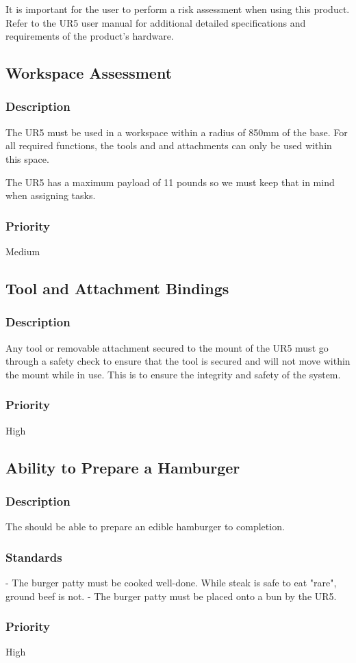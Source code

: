 It is important for the user to perform a risk assessment when using this product. Refer to the UR5 user manual for additional detailed specifications and requirements of the product's hardware. 

\subsection{Workspace Assessment}
\subsubsection{Description}
The UR5 must be used in a workspace within a radius of 850mm of the base. For all required functions, the tools and and attachments can only be used within this space. 

The UR5 has a maximum payload of 11 pounds so we must keep that in mind when assigning tasks.
\subsubsection{Priority}
Medium

\subsection{Tool and Attachment Bindings}
\subsubsection{Description}
Any tool or removable attachment secured to the mount of the UR5 must go through a safety check to ensure that the tool is secured and will not move within the mount while in use. This is to ensure the integrity and safety of the system.
\subsubsection{Priority}
High


\subsection{Ability to Prepare a Hamburger}
\subsubsection{Description}
The \productname{} should be able to prepare an edible hamburger to completion. 
\subsubsection{Standards}
- The burger patty must be cooked well-done. While steak is safe to eat "rare", ground beef is not. 
- The burger patty must be placed onto a bun by the UR5.   
\subsubsection{Priority}
High
